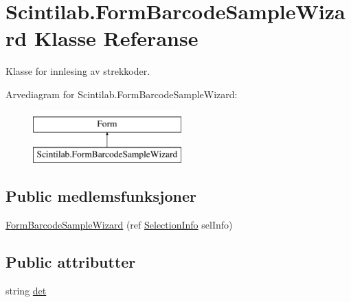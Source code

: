\hypertarget{class_scintilab_1_1_form_barcode_sample_wizard}{\section{Scintilab.\+Form\+Barcode\+Sample\+Wizard Klasse Referanse}
\label{class_scintilab_1_1_form_barcode_sample_wizard}
}


Klasse for innlesing av strekkoder.  


Arvediagram for Scintilab.\+Form\+Barcode\+Sample\+Wizard\+:\begin{figure}[H]
\begin{center}
\leavevmode
\includegraphics[height=2.000000cm]{class_scintilab_1_1_form_barcode_sample_wizard}
\end{center}
\end{figure}
\subsection*{Public medlemsfunksjoner}
\begin{DoxyCompactItemize}
\item 
\hyperlink{class_scintilab_1_1_form_barcode_sample_wizard_a4a103b58d1b7484057047fcad7db0ed6}{Form\+Barcode\+Sample\+Wizard} (ref \hyperlink{class_scintilab_1_1_selection_info}{Selection\+Info} sel\+Info)
\end{DoxyCompactItemize}
\subsection*{Public attributter}
\begin{DoxyCompactItemize}
\item 
string \hyperlink{class_scintilab_1_1_form_barcode_sample_wizard_a7b70de65be45e93c95b176887be00dd0}{det}
\end{DoxyCompactItemize}

